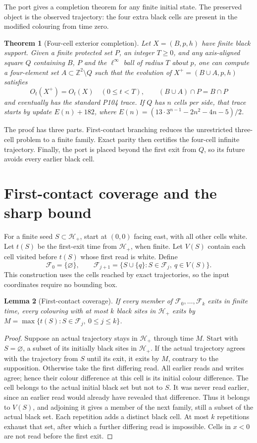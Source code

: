 \documentclass[11pt]{article}
\newtheorem{theorem}{Theorem}
\newtheorem{lemma}[theorem]{Lemma}
\newcommand{\Z}{\mathbb Z}
\newcommand{\HH}{\mathcal H}
\begin{document}
The port gives a completion theorem for any finite initial state. The
preserved object is the observed trajectory: the four extra black cells are
present in the modified colouring from time zero.

\begin{theorem}[Four-cell exterior completion]\label{th:extension}
Let $X=(B,p,h)$ have finite black support. Given a finite protected set $P$,
an integer $T\ge0$, and any axis-aligned square $Q$ containing $B$, $P$ and
the $\ell^\infty$ ball of radius $T$ about $p$, one can compute a four-element
set $A\subset\Z^2\setminus Q$ such that the evolution of
$X^+=(B\cup A,p,h)$ satisfies
\[
 O_t(X^+)=O_t(X)\quad(0\le t<T),\qquad (B\cup A)\cap P=B\cap P
\]
and eventually has the standard P104 trace. If $Q$ has $n$ cells per side,
that trace starts by update
$E(n)+182$, where $E(n)=(13\cdot3^{n-1}-2n^2-4n-5)/2$.
\end{theorem}

The proof has three parts. First-contact branching reduces the unrestricted
three-cell problem to a finite family. Exact parity then certifies the
four-cell infinite trajectory. Finally, the port is placed beyond the first
exit from $Q$, so its future avoids every earlier black cell.

\section{First-contact coverage and the sharp bound}
For a finite seed $S\subset\HH_+$, start at $(0,0)$ facing east, with all other cells white. Let $t(S)$ be the first-exit time from $\HH_+$, when finite.
Let $V(S)$ contain each cell visited before $t(S)$ whose first read is white. Define
\[
 \mathcal F_0=\{\varnothing\},\qquad
 \mathcal F_{j+1}=\{S\cup\{q\}:S\in\mathcal F_j,\ q\in V(S)\}.
\]
This construction uses the cells reached by exact trajectories, so the input
coordinates require no bounding box.

\begin{lemma}[First-contact coverage]\label{lem:coverage}
If every member of $\mathcal F_0,\ldots,\mathcal F_k$ exits in finite time,
every colouring with at most $k$ black sites in $\HH_+$ exits by
$M=\max\{t(S):S\in\mathcal F_j,\ 0\le j\le k\}$.
\end{lemma}
\begin{proof}
Suppose an actual trajectory stays in $\HH_+$ through time $M$. Start with
$S=\varnothing$, a subset of its initially black sites in $\HH_+$. If the
actual trajectory agrees with the trajectory from $S$ until its exit, it
exits by $M$, contrary to the supposition. Otherwise take the first differing
read. All earlier reads and writes agree; hence their colour difference at
this cell is its initial colour difference. The cell belongs to the actual
initial black set but not to $S$. It was never read earlier, since an earlier
read would already have revealed that difference. Thus it belongs to $V(S)$,
and adjoining it gives a member of the next family, still a subset of the
actual black set. Each repetition adds a distinct black cell. At most $k$
repetitions exhaust that set, after which a further differing read is
impossible. Cells in $x<0$ are not read before the first exit.
\end{proof}
\end{document}
